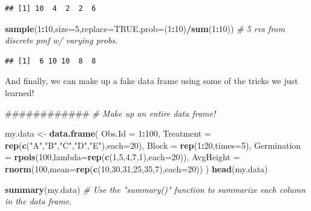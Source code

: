 \documentclass[]{article}
\newenvironment{Shaded}{\begin{snugshade}}{\end{snugshade}}
\newcommand{\KeywordTok}[1]{\textcolor[rgb]{0.13,0.29,0.53}{\textbf{#1}}}
\newcommand{\DataTypeTok}[1]{\textcolor[rgb]{0.13,0.29,0.53}{#1}}
\newcommand{\DecValTok}[1]{\textcolor[rgb]{0.00,0.00,0.81}{#1}}
\newcommand{\StringTok}[1]{\textcolor[rgb]{0.31,0.60,0.02}{#1}}
\newcommand{\CommentTok}[1]{\textcolor[rgb]{0.56,0.35,0.01}{\textit{#1}}}
\newcommand{\OtherTok}[1]{\textcolor[rgb]{0.56,0.35,0.01}{#1}}
\newcommand{\OperatorTok}[1]{\textcolor[rgb]{0.81,0.36,0.00}{\textbf{#1}}}
\newcommand{\NormalTok}[1]{#1}
\begin{document}
\begin{verbatim}
## [1] 10  4  2  2  6
\end{verbatim}

\begin{Shaded}
\begin{Highlighting}[]
\KeywordTok{sample}\NormalTok{(}\DecValTok{1}\OperatorTok{:}\DecValTok{10}\NormalTok{,}\DataTypeTok{size=}\DecValTok{5}\NormalTok{,}\DataTypeTok{replace=}\OtherTok{TRUE}\NormalTok{,}\DataTypeTok{prob=}\NormalTok{(}\DecValTok{1}\OperatorTok{:}\DecValTok{10}\NormalTok{)}\OperatorTok{/}\KeywordTok{sum}\NormalTok{(}\DecValTok{1}\OperatorTok{:}\DecValTok{10}\NormalTok{)) }\CommentTok{# 5 rvs from discrete pmf w/ varying probs.}
\end{Highlighting}
\end{Shaded}

\begin{verbatim}
## [1]  6 10 10  8  8
\end{verbatim}

And finally, we can make up a fake data frame using some of the tricks
we just learned!

\begin{Shaded}
\begin{Highlighting}[]
\NormalTok{############}
\CommentTok{# Make up an entire data frame!}


\NormalTok{my.data <-}\StringTok{ }\KeywordTok{data.frame}\NormalTok{(}
  \DataTypeTok{Obs.Id =} \DecValTok{1}\OperatorTok{:}\DecValTok{100}\NormalTok{,}
  \DataTypeTok{Treatment =} \KeywordTok{rep}\NormalTok{(}\KeywordTok{c}\NormalTok{(}\StringTok{"A"}\NormalTok{,}\StringTok{"B"}\NormalTok{,}\StringTok{"C"}\NormalTok{,}\StringTok{"D"}\NormalTok{,}\StringTok{"E"}\NormalTok{),}\DataTypeTok{each=}\DecValTok{20}\NormalTok{),}
  \DataTypeTok{Block =} \KeywordTok{rep}\NormalTok{(}\DecValTok{1}\OperatorTok{:}\DecValTok{20}\NormalTok{,}\DataTypeTok{times=}\DecValTok{5}\NormalTok{),}
  \DataTypeTok{Germination =} \KeywordTok{rpois}\NormalTok{(}\DecValTok{100}\NormalTok{,}\DataTypeTok{lambda=}\KeywordTok{rep}\NormalTok{(}\KeywordTok{c}\NormalTok{(}\DecValTok{1}\NormalTok{,}\DecValTok{5}\NormalTok{,}\DecValTok{4}\NormalTok{,}\DecValTok{7}\NormalTok{,}\DecValTok{1}\NormalTok{),}\DataTypeTok{each=}\DecValTok{20}\NormalTok{)),}
  \DataTypeTok{AvgHeight =} \KeywordTok{rnorm}\NormalTok{(}\DecValTok{100}\NormalTok{,}\DataTypeTok{mean=}\KeywordTok{rep}\NormalTok{(}\KeywordTok{c}\NormalTok{(}\DecValTok{10}\NormalTok{,}\DecValTok{30}\NormalTok{,}\DecValTok{31}\NormalTok{,}\DecValTok{25}\NormalTok{,}\DecValTok{35}\NormalTok{,}\DecValTok{7}\NormalTok{),}\DataTypeTok{each=}\DecValTok{20}\NormalTok{))}
\NormalTok{)}
\KeywordTok{head}\NormalTok{(my.data)}

\KeywordTok{summary}\NormalTok{(my.data)    }\CommentTok{# Use the "summary()" function to summarize each column in the data frame.}
\end{Highlighting}
\end{Shaded}
\end{document}

